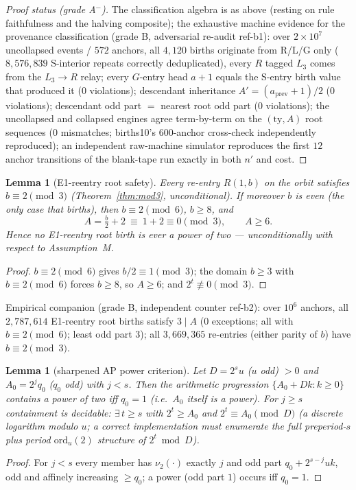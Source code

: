 \documentclass[11pt]{amsart}
\newtheorem{lemma}[theorem]{Lemma}
\theoremstyle{definition}
\newcommand{\vtwo}[1]{\nu_2(#1)}
\begin{document}
\begin{proof}[Proof status (grade A$^-$)]
The classification algebra is as above (resting on rule faithfulness and the
halving composite); the exhaustive machine evidence for the provenance
classification (grade B, adversarial re-audit ref-b1): over $2\times10^{7}$
uncollapsed events / $572$ anchors, all $4{,}120$ births originate from R/L/G
only ($8{,}576{,}839$ S-interior repeats correctly deduplicated), every
$R$ tagged $L_3$ comes from the $L_3\to R$ relay; every $G$-entry head
$a{+}1$ equals the S-entry birth value that produced it ($0$ violations);
descendant inheritance $A'=(a_{\mathrm{prev}}{+}1)/2$ ($0$ violations);
descendant odd part $=$ nearest root odd part ($0$ violations); the
uncollapsed and collapsed engines agree term-by-term on the $(\mathrm{ty},A)$
root sequences ($0$ mismatches; births10's $600$-anchor cross-check
independently reproduced); an independent raw-machine simulator reproduces
the first $12$ anchor transitions of the blank-tape run exactly in both
$n'$ and cost.
\end{proof}

\begin{lemma}[E1-reentry root safety]\label{lem:e1}
Every re-entry $R(1,b)$ on the orbit satisfies $b\equiv2\pmod3$
(Theorem~\ref{thm:mod3}, unconditional). If moreover $b$ is even (the only
case that births), then $b\equiv2\pmod6$, $b\ge8$, and
\[
A=\tfrac b2+2\ \equiv\ 1+2\equiv0\pmod3,\qquad A\ge6 .
\]
Hence \emph{no E1-reentry root birth is ever a power of two} ---
unconditionally with respect to Assumption~M.
\end{lemma}
\begin{proof}
$b\equiv2\pmod6$ gives $b/2\equiv1\pmod3$; the domain $b\ge3$ with
$b\equiv2\pmod6$ forces $b\ge8$, so $A\ge6$; and $2^{t}\not\equiv0\pmod3$.
\end{proof}
Empirical companion (grade B, independent counter ref-b2): over $10^{6}$
anchors, all $2{,}787{,}614$ E1-reentry root births satisfy $3\mid A$ ($0$
exceptions; all with $b\equiv2\pmod6$; least odd part $3$); all
$3{,}669{,}365$ re-entries (either parity of $b$) have $b\equiv2\pmod3$.

\begin{lemma}[sharpened AP power criterion]\label{lem:ap}
Let $D=2^{s}u$ ($u$ odd) $>0$ and $A_0=2^{j}q_0$ ($q_0$ odd) with $j<s$.
Then the arithmetic progression $\{A_0+Dk:k\ge0\}$ contains a power of two
\emph{iff} $q_0=1$ (i.e.\ $A_0$ itself is a power). For $j\ge s$ containment
is decidable: $\exists\,t\ge s$ with $2^{t}\ge A_0$ and $2^{t}\equiv
A_0\pmod D$ (a discrete logarithm modulo $u$; a correct implementation must
enumerate the full preperiod-$s$ plus period $\mathrm{ord}_u(2)$ structure of
$2^{t}\bmod D$).
\end{lemma}
\begin{proof}
For $j<s$ every member has $\vtwo{\cdot}$ exactly $j$ and odd part
$q_0+2^{s-j}uk$, odd and affinely increasing $\ge q_0$; a power (odd part
$1$) occurs iff $q_0=1$.
\end{proof}
\end{document}
